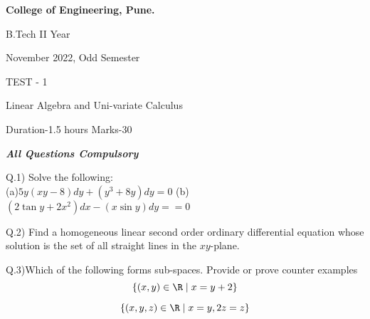 \documentclass[a4paper,12pt,oneside,article]{memoir}
\begin{document}
\begin{center}
  \bfseries\large
 College of Engineering, Pune.
 
  B.Tech II Year

  November 2022, Odd Semester
  \begin{center}
      TEST - 1
  \end{center}

  Linear Algebra and Uni-variate Calculus \qquad

  \bigskip

  \normalfont\normalsize
  Duration-1.5 hours     Marks-30 
\end{center}

\hrulefill

\emph{\textbf{All Questions Compulsory}}


\begin{flushleft}
Q.1) Solve the following:\\[10pt] 
(a)$5y(xy-8)dy+(y^3+8y)dy=0$
\newline
(b)$(2\tan{}{y} + 2x^2)dx -(x\sin{y})dy==0$
\end{flushleft} 
\begin{flushright} [3x2=6]
\end{flushright}



\begin{flushleft}
 Q.2) Find a homogeneous linear second order ordinary differential equation whose solution is the set of all straight lines in the $xy$-plane.\\ 
\end{flushleft}

\begin{flushright} [2]
\end{flushright}

\begin{flushleft}
 Q.3)Which of the following forms sub-spaces. Provide or prove counter examples
\begin{equation*}
	\{(x,y)\in \R \mid x=y+2\} 
\end{equation*}

\begin{equation*}
	\{(x,y,z) \in \R \mid  x=y  , 2z =z\} 
\end{equation*}

\end{flushleft}

\begin{flushright} [3x2=6]
\end{flushright}
\end{document}
